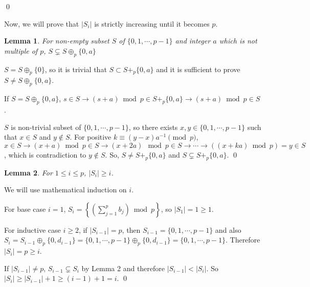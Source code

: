 \documentclass[11pt]{article}
\newtheorem{lemma}{Lemma}
\begin{document}
\qed

\vspace{\baselineskip}

Now, we will prove that $\lvert S_{i} \rvert$ is strictly increasing until it becomes $p$.

\begin{lemma}
    For non-empty subset $S$ of $\{0, 1, \cdots, p-1\}$ and integer $a$ which is not multiple of $p$, $S \subsetneq S \oplus_p \{0, a\}$
\end{lemma}

$S=S \oplus_p \{0\}$, so it is trivial that $S \subset S +_p \{0, a\}$ and it is sufficient to prove $S \neq S \oplus_p \{0, a\}$.

If $S = S \oplus_p \{0, a\}$, $s \in S \rightarrow (s+a) \bmod p \in S+_p \{0, a\} \rightarrow (s+a) \bmod p \in S$.

$S$ is non-trivial subset of $\{0, 1, \cdots, p-1\}$, so there exists $x, y \in \{0, 1, \cdots, p-1\}$ such that $x \in S$ and $y \not\in S$. For positive $k \equiv (y-x) a^{-1} \pmod p$, $x \in S \rightarrow (x+a) \bmod p \in S \rightarrow (x + 2a) \mod p \in S \rightarrow \cdots \rightarrow  \left((x+ka) \bmod p\right)  = y  \in S$, which is contradiction to $y \not\in S$. So, $S \neq S +_p \{0, a\}$ and $S \subsetneq S+_p \{0, a\}$. \qed




\begin{lemma}

For $1 \le i \le p$, $|S_i| \ge i$.

\end{lemma}

We will use mathematical induction on $i$.

For base case $i=1$, $S_i = \left\{\left(\sum_{j=1}^{p} b_j\right) \bmod p \right\}$, so $|S_1| = 1 \ge 1$.

For inductive case $i \ge 2$, if $\lvert S_{i-1} \rvert = p$, then $S_{i-1}=\{0, 1, \cdots, p-1\}$ and also $S_i=S_{i-1} \oplus_p \{0, d_{i-1}\}=\{0, 1, \cdots, p-1\}\oplus_p \{0, d_{i-1}\}=\{0, 1, \cdots, p-1\}$. Therefore $|S_i|=p \ge i$.

If $|S_{i-1}| \ne p$, $S_{i-1} \subsetneq S_{i}$ by Lemma 2 and therefore $|S_{i-1}| < |S_{i}|$. So $|S_i| \ge |S_{i-1}|+1 \ge (i-1)+1 = i$. \qed

\vspace{\baselineskip}
\end{document}
